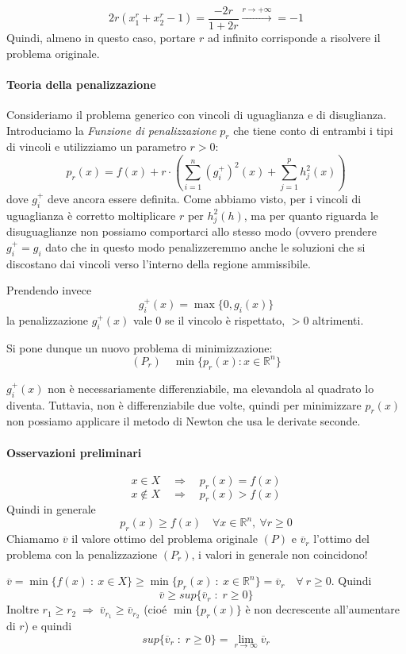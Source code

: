 $$ 2r(x_1^{r} + x_2^{r} -1 ) = \dfrac{-2r}{1+2r}
\xrightarrow{r \to + \infty} = -1
$$
Quindi, almeno in questo caso, portare $r$ ad infinito corrisponde
a risolvere il problema originale.
\paragraph{Teoria della penalizzazione}
Consideriamo il problema generico con vincoli di uguaglianza e di disuglianza. Introduciamo la \emph{Funzione di penalizzazione} $p_r$ che tiene conto di entrambi i tipi di vincoli e utilizziamo un parametro $r > 0$:
$$ p_r(x) = f(x) + r \cdot \left(
\displaystyle \sum_{i=1}^{n} ({g^+_i})^{2}(x) +
\displaystyle \sum_{j=1}^{p} h_j^{2}(x)
\right)
$$
dove $g^+_i$ deve ancora essere definita. Come abbiamo visto, per i vincoli di uguaglianza è corretto moltiplicare $r$ per $h_j^2(h)$, ma per quanto riguarda le disuguaglianze non possiamo comportarci allo stesso modo (ovvero prendere $g^+_i = g_i$ dato che in questo modo penalizzeremmo anche le soluzioni che si discostano dai vincoli verso l'interno della regione ammissibile.

Prendendo invece
$$ g_i^{+}(x) = \max\{ 0, g_i(x) \} $$
la penalizzazione $g_i^{+}(x)$ vale $0$ se il vincolo è rispettato, $>0$ altrimenti.

Si pone dunque un nuovo problema di minimizzazione:
$$(P_r) \quad \min \{ p_r(x) : x \in \mathbb{R}^{n}  \} $$

\begin{notes}
$g_i^+(x)$ non \`e necessariamente differenziabile, ma elevandola al quadrato lo diventa. Tuttavia,  non \`e differenziabile due volte, quindi per minimizzare $p_r(x)$ non possiamo applicare il metodo di Newton che usa le derivate seconde.\end{notes}


\paragraph{Osservazioni preliminari}
$$x \in X \quad \Rightarrow \quad p_r(x) = f(x) $$
$$x \notin X \quad \Rightarrow \quad p_r(x) > f(x) $$
Quindi in generale
$$ p_r(x) \geq f(x) \quad \forall x \in \mathbb{R}^{n}, ~ \forall r \geq 0$$
Chiamamo $\overline{v}$ il valore ottimo del problema originale $(P)$
e $\overline{v}_r$ l'ottimo del problema con la penalizzazione $(P_r)$,
i valori in generale non coincidono!

\begin{observation}
$\overline{v} = \min\{f(x) ~:~ x \in X\} \geq \min\{p_r(x) ~:~ x \in \mathbb{R}^{n} \} = \overline{v}_r \quad \forall ~ r \geq 0$. Quindi $$\overline{v} \geq
sup\{ \overline{v}_{r}\; : \; r \geq 0 \}$$
Inoltre $r_1 \geq r_2 \; \Rightarrow \; \overline{v}_{r_1}
\geq \overline{v}_{r_2}$ (cioé $\min\{p_r(x)\}$ è non decrescente all'aumentare di $r$) e quindi
$$sup\{\overline{v}_{r}\; : \;r \geq 0 \} = \lim_{r \to \infty} 
\overline{v}_r $$
\end{observation}

